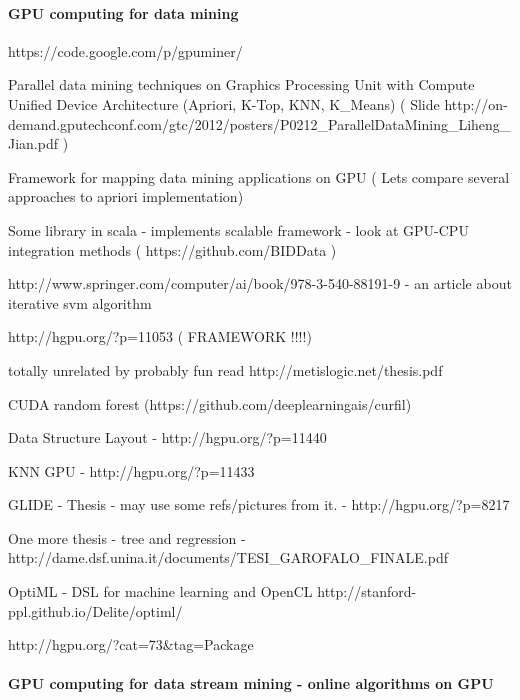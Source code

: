 \documentclass[12]{article}
\begin{document}
\begin{list}{*}{}
\paragraph{GPU computing for data mining}

https://code.google.com/p/gpuminer/

Parallel data mining techniques on Graphics Processing Unit with Compute Unified Device Architecture (Apriori, K-Top, KNN, K_Means)
( Slide http://on-demand.gputechconf.com/gtc/2012/posters/P0212_ParallelDataMining_Liheng_Jian.pdf )

Framework for mapping data mining applications on GPU ( Lets compare several approaches to apriori implementation)

Some library in scala - implements scalable framework - look at GPU-CPU integration methods ( https://github.com/BIDData ) 

http://www.springer.com/computer/ai/book/978-3-540-88191-9 - an article about iterative svm algorithm


http://hgpu.org/?p=11053 ( FRAMEWORK !!!!)

totally unrelated by probably fun read http://metislogic.net/thesis.pdf

CUDA random forest (https://github.com/deeplearningais/curfil)

Data Structure Layout - http://hgpu.org/?p=11440

KNN GPU - http://hgpu.org/?p=11433

GLIDE - Thesis - may use some refs/pictures from it. - http://hgpu.org/?p=8217

One more thesis - tree and regression - http://dame.dsf.unina.it/documents/TESI_GAROFALO_FINALE.pdf


OptiML - DSL for machine learning and OpenCL http://stanford-ppl.github.io/Delite/optiml/



http://hgpu.org/?cat=73&tag=Package


\paragraph{GPU computing for data stream mining - online algorithms on GPU}

\end{list}
\end{document}
